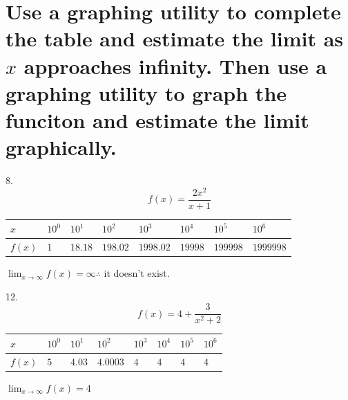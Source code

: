 \documentclass[11pt]{article}
\begin{document}
\section{Use a graphing utility to complete the table and estimate the limit as $x$ approaches infinity. Then use a graphing utility to graph the funciton and estimate the limit graphically.}
8.\[f(x)=\frac{2x^2}{x+1}\]
\begin{flushleft}
    \begin{table}[h]
        \begin{tabular}{|l|l|l|l|l|l|l|l|}
        \hline
        $x$ & $10^0$ & $10^1$ & $10^2$ & $10^3$ & $10^4$ & $10^5$ & $10^6$\\ \hline
        $f(x)$ & $1$ & $18.18$ & $198.02$ & $1998.02$ & $19998$ & $199998$ & $1999998$\\ \hline
        \end{tabular}
    \end{table}
\end{flushleft}
$\lim_{x\to\infty}f(x)=\infty\therefore$ it doesn't exist.

12.\[f(x)=4+\frac{3}{x^2+2}\]
\begin{flushleft}
    \begin{table}[h]
        \begin{tabular}{|l|l|l|l|l|l|l|l|}
        \hline
        $x$ & $10^0$ & $10^1$ & $10^2$ & $10^3$ & $10^4$ & $10^5$ & $10^6$\\ \hline
        $f(x)$ & $5$ & $4.03$ & $4.0003$ & $4$ & $4$ & $4$ & $4$\\ \hline
        \end{tabular}
    \end{table}
\end{flushleft}
$\lim_{x\to\infty}f(x)=4$
\end{document}

